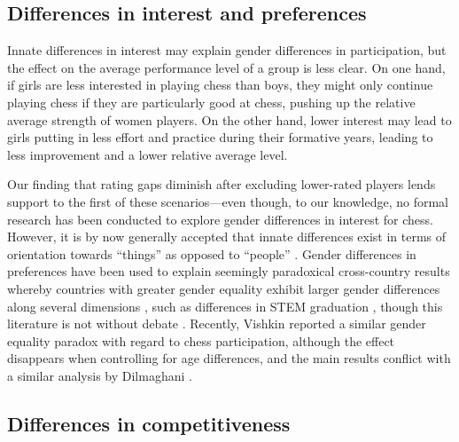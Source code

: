 \documentclass[9pt,twocolumn,twoside,lineno]{pnas-new}
\begin{document}
\subsection*{Differences in interest and preferences}

Innate differences in interest may explain gender differences in participation, but the effect on the average performance level of a group is less clear. On one hand, if girls are less interested in playing chess than boys, they might only continue playing chess if they are particularly good at chess, pushing up the relative average strength of women players. On the other hand, lower interest may lead to girls putting in less effort and practice during their formative years, leading to less improvement and a lower relative average level.

Our finding that rating gaps diminish after excluding lower-rated players lends support to the first of these scenarios---even though, to our knowledge, no formal research has been conducted to explore gender differences in interest for chess. However, it is by now generally accepted that innate differences exist in terms of orientation towards ``things'' as opposed to ``people'' \cite{beltz2011, lippa2010}. Gender differences in preferences have been used to explain seemingly paradoxical cross-country results whereby countries with greater gender equality exhibit larger gender differences along several dimensions \cite{Falk2018,schmitt2017}, such as differences in STEM graduation \cite{Stoet2018}, though this literature is not without debate \cite{Richardson2020}. Recently, Vishkin \citep{vishkin2022} reported a similar gender equality paradox with regard to chess participation, although the effect disappears when controlling for age differences, and the main results conflict with a similar analysis by Dilmaghani \citep{dilmaghani2021}. 


\subsection*{Differences in competitiveness}
\end{document}
